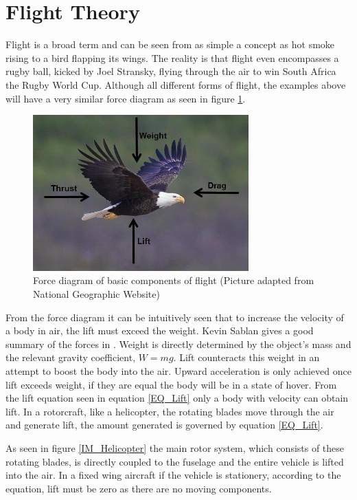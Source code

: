 
\section{Flight Theory}
Flight is a broad term and can be seen from as simple a concept as hot smoke rising to a bird flapping its wings. The reality is that flight even encompasses a rugby ball, kicked by Joel Stransky, flying through the air to win South Africa the Rugby World Cup. Although all different forms of flight, the examples above will have a very similar force diagram as seen in figure \ref{IM_FlightForces}.

\begin{figure}
\centering
\includegraphics[height = 6cm]{Images/Literature/Bird}
\caption{Force diagram of basic components of flight (Picture adapted from National Geographic Website)}
\label{IM_FlightForces}
\end{figure}

From the force diagram it can be intuitively seen that to increase the velocity of a body in air, the lift must exceed the weight. Kevin Sablan gives a good summary of the forces in \cite{TheoryofFlight}.
Weight is directly determined by the object's mass and the relevant gravity coefficient, $W = mg$. Lift counteracts this weight in an attempt to boost the body into the air. Upward acceleration is only achieved once lift exceeds weight, if they are equal the body will be in a state of hover. From the lift equation seen in equation \ref{EQ_Lift} only a body with velocity can obtain lift. In a rotorcraft, like a helicopter, the rotating blades move through the air and generate lift, the amount generated is governed by equation \ref{EQ_Lift}. 

As seen in figure \ref{IM_Helicopter} the main rotor system, which consists of these rotating blades, is directly coupled to the fuselage and the entire vehicle is lifted into the air. In a fixed wing aircraft if the vehicle is stationery, according to the equation, lift must be zero as there are no moving components. 

